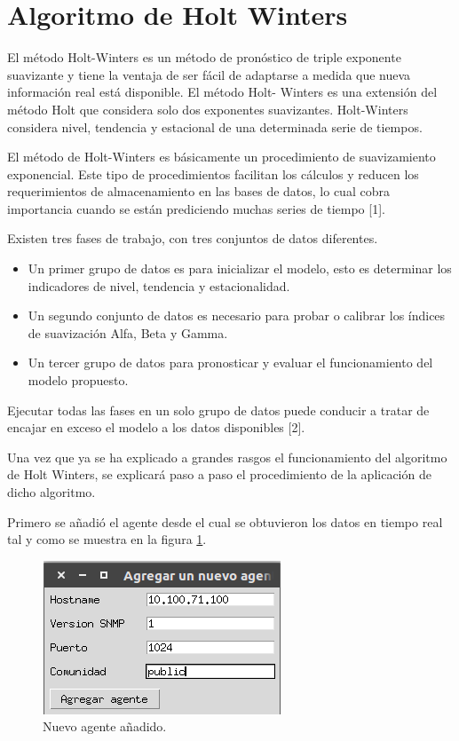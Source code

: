 \section{Algoritmo de Holt Winters}
El método Holt-Winters es un método de pronóstico de triple exponente suavizante y tiene la ventaja de ser fácil de adaptarse a medida que nueva información real está disponible. El método Holt- Winters es una extensión del método Holt que considera solo dos exponentes suavizantes. Holt-Winters considera nivel, tendencia y estacional de una determinada serie de tiempos. 
\\ \par
El método de Holt-Winters es básicamente un procedimiento de suavizamiento exponencial. Este tipo de procedimientos facilitan los cálculos y reducen los requerimientos de almacenamiento en las bases de datos, lo cual cobra importancia cuando se están prediciendo muchas series de tiempo [1].
\\ \par

Existen tres fases de trabajo, con tres conjuntos de datos diferentes. 
\begin{itemize}
\item Un primer grupo de datos es para inicializar
el modelo, esto es determinar los indicadores de nivel, tendencia y estacionalidad. 
\item Un segundo conjunto de datos es necesario para probar o calibrar los índices de suavización Alfa, Beta y Gamma.
\item Un tercer grupo de datos para pronosticar y evaluar el funcionamiento del modelo propuesto.
\end{itemize}
Ejecutar todas las fases en un solo grupo de datos puede conducir a tratar de encajar en exceso el modelo a los datos disponibles [2].
\\ \par
Una vez que ya se ha explicado a grandes rasgos el funcionamiento del algoritmo de Holt Winters, se explicará paso a paso el procedimiento de la aplicación de dicho algoritmo.
\\ \par 
Primero se añadió el agente desde el cual se obtuvieron los datos en tiempo real tal y como se muestra en la figura \ref{image:agente}. 
\FloatBarrier
\begin{figure}[htbp!]
		\centering
			\includegraphics[width=.45 \textwidth]{images/agente}
		\caption{Nuevo agente añadido.}
		\label{image:agente}
\end{figure}
\FloatBarrier

